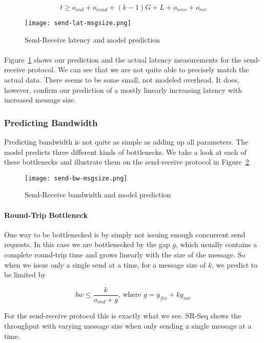 $$
t \geq o_{snd} + o_{nsnd}  + (k-1)G + L + o_{nrcv} + o_{rcv}
$$


\begin{figure}[ht]
  \centering
  \texttt{[image: send-lat-msgsize.png]}
  \caption{Send-Receive latency and model prediction}
    \label{fig:model-lat}
\end{figure}

\paragraph{} Figure~\ref{fig:model-lat} shows our prediction and the actual latency measurements for the send-receive protocol.
We can see that we are not quite able to precisely match the actual data. There seems to be some small, not modeled overhead.
It does, however, confirm our prediction of a mostly linearly increasing latency with increased message size.

\pagebreak
\subsubsection{Predicting Bandwidth}
Predicting bandwidth is not quite as simple as adding up all parameters. The model predicts three different kinds of
bottlenecks. We take a look at each of these bottlenecks and illustrate them on the send-receive protocol in Figure~\ref{fig:model-bw}.

\begin{figure}[ht]
  \centering
  \texttt{[image: send-bw-msgsize.png]}
  \caption{Send-Receive bandwidth and model prediction}
    \label{fig:model-bw}
\end{figure}

\paragraph{Round-Trip Bottleneck} One way to be bottlenecked is by simply not issuing enough concurrent send requests. In 
this case we are bottlenecked by the gap $g$, which usually contains a complete round-trip time and grows linearly with 
the size of the message. So when we issue only a single send at a time, for a message size of $k$, we predict to be limited by

$$
bw \leq \frac{k}{o_{snd} + g}\text{, where } g = g_{fix} + kg_{var} 
$$

For the send-receive protocol this is exactly what we see. SR-Seq shows the throughput with varying message size when only 
sending a single message at a time. 

